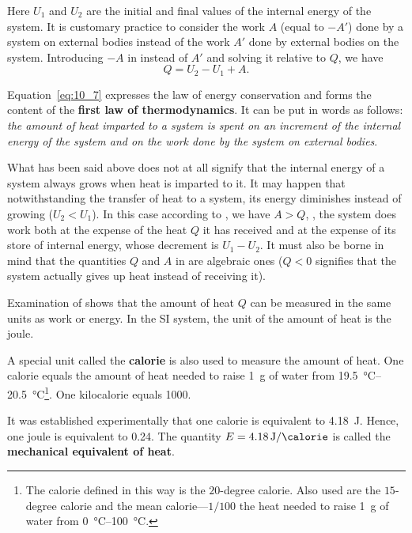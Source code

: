 \noindent
Here $U_1$ and $U_2$ are the initial and final values of the internal energy of the system. It is customary practice to consider the work $A$ (equal to $-A'$) done by a system on external bodies instead of the work $A'$ done by external bodies on the system. Introducing $-A$ in  instead of $A'$ and solving it relative to $Q$, we have
\begin{equation}\label{eq:10_7}
	Q = U_2 - U_1 + A.
\end{equation}

Equation~\eqref{eq:10_7} expresses the law of energy conservation and forms the content of the \textbf{first law of thermodynamics}. It can be put in words as follows: \textit{the amount of heat imparted to a system is spent on an increment of the internal energy of the system and on the work done by the system on external bodies}.

What has been said above does not at all signify that the internal energy of a system always grows when heat is imparted to it. It may happen that notwithstanding the transfer of heat to a system, its energy diminishes instead of growing ($U_2<U_1$). In this case according to , we have $A>Q$, \ie, the system does work both at the expense of the heat $Q$ it has received and at the expense of its store of internal energy, whose decrement is $U_1-U_2$. It must also be borne in mind that the quantities $Q$ and $A$ in  are algebraic ones ($Q<0$ signifies that the system actually gives up heat instead of receiving it).

Examination of  shows that the amount of heat $Q$ can be measured in the same units as work or energy. In the SI system, the unit of the amount of heat is the joule.

A special unit called the \textbf{calorie} is also used to measure the amount of heat. One calorie equals the amount of heat needed to raise \SI{1}{\gram} of water from \SIrange{19.5}{20.5}{\degreeCelsius}\footnote{The calorie defined in this way is the $20$-degree calorie. Also used are the $15$-degree calorie and the mean calorie---$1/100$ the heat needed to raise \SI{1}{\gram} of water from \SIrange{0}{100}{\degreeCelsius}.}. One kilocalorie equals \SI{1000}{\calorie}.

It was established experimentally that one calorie is equivalent to \SI{4.18}{\joule}. Hence, one joule is equivalent to \SI{0.24}{\calorie}. The quantity $E=\SI{4.18}{\joule\per\calorie}$ is called the \textbf{mechanical equivalent of heat}.


